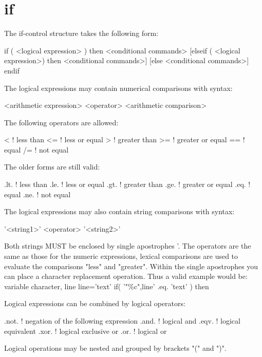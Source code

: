\section{if}
The if-control structure takes the following form: 
\par
\begin{MacVerbatim}
if ( <logical expression> ) then
  <conditional commands>
[elseif ( <logical expression>) then
  <conditional commands>]
[else
  <conditional commands>]
endif
\end{MacVerbatim}
The logical expressions may contain numerical comparisons with syntax: 
\par
\begin{MacVerbatim}
<arithmetic expression> <operator> <arithmetic comparison>
\end{MacVerbatim}
The following operators are allowed: 
\par
\begin{MacVerbatim}
 <      ! less than
 <=     ! less or equal
 >      ! greater than
 >=     ! greater or equal
 ==     ! equal
 /=     ! not equal
\end{MacVerbatim}
The older forms are still valid: 
\begin{MacVerbatim}
.lt.    ! less than
.le.    ! less or equal
.gt.    ! greater than
.ge.    ! greater or equal
.eq.    ! equal
.ne.    ! not equal
\end{MacVerbatim}
The logical expressions may also contain string comparisons with syntax: 
\par
\begin{MacVerbatim}
'<string1>' <operator> '<string2>'
\end{MacVerbatim}
Both strings MUST be enclosed by single apostrophes '. The operators 
are the same as those for the numeric expressions, lexical comparisons 
are used to evaluate the comparisons "less" and "greater". 
Within the single apostrophes you can place a character replacement 
operation. Thus a valid example would be: 
variable character, line 
line='text' 
if( '"\%c",line' .eq. 'text' ) then 
\par
Logical expressions can be combined by logical operators: 
\par
\begin{MacVerbatim}
.not.   ! negation of the following expression
.and.   ! logical and
.eqv.   ! logical equivalent
.xor.   ! logical exclusive or
.or.    ! logical or
\end{MacVerbatim}
Logical operations may be nested and grouped by brackets "(" and ")". 
